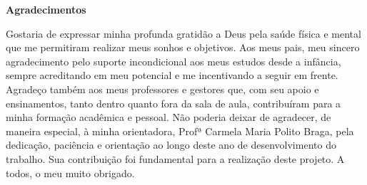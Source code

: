 
\begin{center}
\huge{{\bf Agradecimentos}}
\vspace{4cm}
\end{center}

Gostaria de expressar minha profunda gratidão a Deus pela saúde física e mental que me permitiram realizar meus sonhos e objetivos. Aos meus pais, meu sincero agradecimento pelo suporte incondicional aos meus estudos desde a infância, sempre acreditando em meu potencial e me incentivando a seguir em frente. Agradeço também aos meus professores e gestores que, com seu apoio e ensinamentos, tanto dentro quanto fora da sala de aula, contribuíram para a minha formação acadêmica e pessoal. Não poderia deixar de agradecer, de maneira especial, à minha orientadora, Profª Carmela Maria Polito Braga, pela dedicação, paciência e orientação ao longo deste ano de desenvolvimento do trabalho. Sua contribuição foi fundamental para a realização deste projeto. A todos, o meu muito obrigado. 
\clearpage
\thispagestyle{empty}
\cleardoublepage